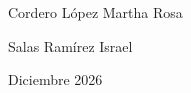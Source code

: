 \begin{titlepage}
\begin{center}
\vspace{0.5cm}
\noindent
\begin{minipage}[t]{0.48\textwidth}
  \centering
  \vspace{0pt} 
  Cordero López Martha Rosa
\end{minipage}%
\hfill
\begin{minipage}[t]{0.48\textwidth}
  \centering
  \vspace{0pt}
  Salas Ramírez Israel
\end{minipage}

\end{center}

\vspace*{\fill}
\begin{flushright}
Diciembre 2026
\end{flushright}

\restoregeometry
\end{titlepage}
